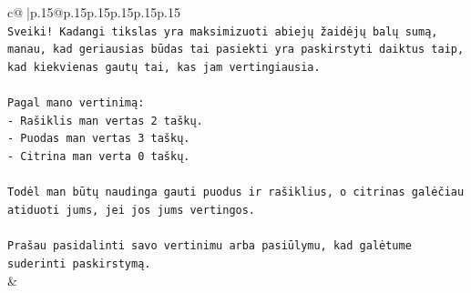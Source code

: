 \documentclass{article}
\begin{document}
{\begin{supertabular}{c@{$\;$}|p{.15\linewidth}@{}p{.15\linewidth}p{.15\linewidth}p{.15\linewidth}p{.15\linewidth}p{.15\linewidth}}
{{{\\ 
\texttt{Sveiki! Kadangi tikslas yra maksimizuoti abiejų žaidėjų balų sumą, manau, kad geriausias būdas tai pasiekti yra paskirstyti daiktus taip, kad kiekvienas gautų tai, kas jam vertingiausia.} \\
\\ 
\texttt{Pagal mano vertinimą:} \\
\texttt{{-} Rašiklis man vertas 2 taškų.} \\
\texttt{{-} Puodas man vertas 3 taškų.} \\
\texttt{{-} Citrina man verta 0 taškų.} \\
\\ 
\texttt{Todėl man būtų naudinga gauti puodus ir rašiklius, o citrinas galėčiau atiduoti jums, jei jos jums vertingos.} \\
\\ 
\texttt{Prašau pasidalinti savo vertinimu arba pasiūlymu, kad galėtume suderinti paskirstymą.} \\
            }
        }
    }
    & \\ \\


\end{supertabular}}
\end{document}
